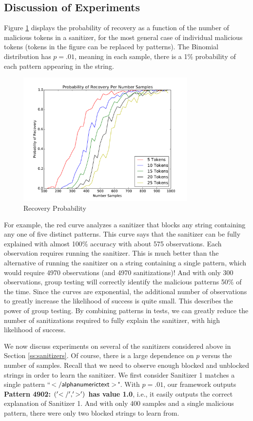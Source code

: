 \subsection{Discussion of Experiments}
Figure \ref{fig:recovery_probability} displays the probability of recovery as a function of the number of malicious tokens in a sanitizer, for the most general case of individual malicious tokens (tokens in the figure can be replaced by patterns). The Binomial distribution has $p=.01$, meaning in each sample, there is a 1\% probability of each pattern appearing in the string.
\begin{figure}[!thb]
	\centering
	\includegraphics[width=3.5in]{./recovery_probability_per_samples.pdf}
	\caption{Recovery Probability}
	\label{fig:recovery_probability}
\end{figure}
For example, the red curve analyzes a sanitizer that blocks any string containing any one of five distinct patterns. This curve says that the sanitizer can be fully explained with almost 100\% accuracy with about 575 observations. Each observation requires running the sanitizer. This is much better than the alternative of running the sanitizer on a string containing a single pattern, which would require 4970 observations (and 4970 sanitizations)! And with only 300 observations, group testing will correctly identify the malicious patterns 50\% of the time. Since the curves are exponential, the additional number of observations to greatly increase the likelihood of success is quite small. This describes the power of group testing. By combining patterns in tests, we can greatly reduce the number of sanitizations required to fully explain the sanitizer, with high likelihood of success.

We now discuss experiments on several of the sanitizers considered above in Section \ref{ss:sanitizers}. Of course, there is a large dependence on $p$ versus the number of samples. Recall that we need to observe enough blocked and unblocked strings in order to learn the sanitizer. We first consider Sanitizer 1 matches a single pattern ``$\sf{</alphanumerictext>}$". With $p=.01$, our framework outputs \textbf{Pattern 4902: $\sf{('</', '>')}$ has value 1.0}, i.e., it easily outputs the correct explanation of Sanitizer 1. And with only 400 samples and a single malicious pattern, there were only two blocked strings to learn from.

